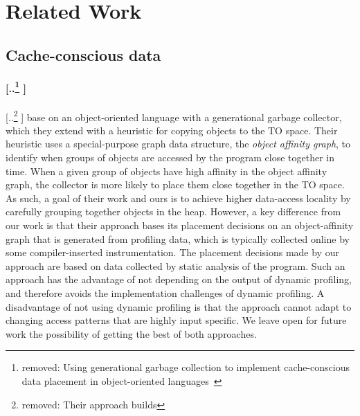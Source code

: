 \documentclass[acmsmall,review,anonymous]{acmart}\settopmatter{printfolios=true,printccs=false,printacmref=false}
\providecommand{\DIFaddtex}[1]{{\protect\color{blue} \sf #1}} %
\providecommand{\DIFdeltex}[1]{{\protect\color{red} [..\footnote{removed: #1} ]}} %
\providecommand{\DIFaddbegin}{} %
\providecommand{\DIFaddend}{} %
\providecommand{\DIFdelbegin}{} %
\providecommand{\DIFdelend}{} %
\providecommand{\DIFadd}[1]{\texorpdfstring{\DIFaddtex{#1}}{#1}} %
\providecommand{\DIFdel}[1]{\texorpdfstring{\DIFdeltex{#1}}{}} %
\newcommand{\DIFscaledelfig}{0.5}
\newlength{\DIFdelgraphicswidth} %
\newlength{\DIFdelgraphicsheight} %
\newcommand{\DIFaddincludegraphics}[2][]{{\color{blue}\fbox{\DIFOincludegraphics[#1]{#2}}}} %
\newcommand{\DIFdelincludegraphics}[2][]{%
\sbox{\DIFdelgraphicsbox}{\DIFOincludegraphics[#1]{#2}}%
\settoboxwidth{\DIFdelgraphicswidth}{\DIFdelgraphicsbox} %
\settoboxtotalheight{\DIFdelgraphicsheight}{\DIFdelgraphicsbox} %
\scalebox{\DIFscaledelfig}{%
\parbox[b]{\DIFdelgraphicswidth}{\usebox{\DIFdelgraphicsbox}\\[-\baselineskip] \rule{\DIFdelgraphicswidth}{0em}}\llap{\resizebox{\DIFdelgraphicswidth}{\DIFdelgraphicsheight}{%
\setlength{\unitlength}{\DIFdelgraphicswidth}%
\begin{picture}(1,1)%
\thicklines\linethickness{2pt} %
{\color[rgb]{1,0,0}\put(0,0){\framebox(1,1){}}}%
{\color[rgb]{1,0,0}\put(0,0){\line( 1,1){1}}}%
{\color[rgb]{1,0,0}\put(0,1){\line(1,-1){1}}}%
\end{picture}%
}\hspace*{3pt}}} %
} %
\DeclareRobustCommand{\DIFaddbegin}{\DIFOaddbegin \let\includegraphics\DIFaddincludegraphics} %
\DeclareRobustCommand{\DIFaddend}{\DIFOaddend \let\includegraphics\DIFOincludegraphics} %
\DeclareRobustCommand{\DIFdelbegin}{\DIFOdelbegin \let\includegraphics\DIFdelincludegraphics} %
\DeclareRobustCommand{\DIFdelend}{\DIFOaddend \let\includegraphics\DIFOincludegraphics} %
\begin{document}
 \section{Related Work}


\subsection{Cache-conscious data}

\DIFdelbegin \paragraph{\DIFdel{Using generational garbage collection to implement cache-conscious data placement in object-oriented languages~\cite{ccgarbage}}}
\addtocounter{paragraph}{-1}%
\DIFdel{Their approach builds }\DIFdelend \DIFaddbegin \DIFadd{\citet{ccgarbage} base }\DIFaddend on an object-oriented language with a
generational garbage collector, which they extend with a heuristic for
copying objects to the TO space.
Their heuristic uses a special-purpose graph data structure, the \emph{object affinity
graph}, to identify when groups of objects are accessed by the program
close together in time.
When a given group of objects have high affinity in the object
affinity graph, the collector is more likely to place them close
together in the TO space.
As such, a goal of their work and ours is to achieve higher data-access locality
by carefully grouping together objects in the heap.
However, a key difference from our work is that their approach bases its placement decisions
on an object-affinity graph that is generated from profiling data, which is
typically collected online by some compiler-inserted instrumentation.
The placement decisions made by our approach are based on data collected by static analysis of the program.
Such an approach has the advantage of not depending on the output of dynamic profiling, and therefore
avoids the implementation challenges of dynamic profiling.
A disadvantage of not using dynamic profiling is that the approach
cannot adapt to changing access patterns that are highly input
specific.
We leave open for future work the possibility of getting the best of both approaches.
\end{document}
